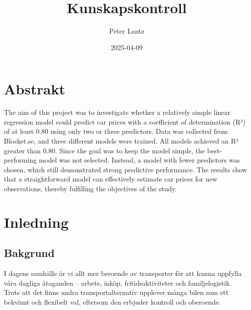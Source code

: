 \documentclass[
  letterpaper,
  DIV=11,
  numbers=noendperiod]{scrreprt}
\title{Kunskapskontroll}
\author{Peter Lantz}
\date{2025-04-09}
\renewcommand*\contentsname{Innehållsförteckning}
\newcommand\contentsname{Innehållsförteckning}
\begin{document}
\maketitle

\renewcommand*\contentsname{Innehållsförteckning}
{
\hypersetup{linkcolor=}
\setcounter{tocdepth}{2}
\tableofcontents
}


\chapter{}\label{section}


\chapter{Abstrakt}\label{abstrakt}

The aim of this project was to investigate whether a relatively simple
linear regression model could predict car prices with a coefficient of
determination (R²) of at least 0.80 using only two or three predictors.
Data was collected from Blocket.se, and three different models were
trained. All models achieved an R² greater than 0.80. Since the goal was
to keep the model simple, the best-performing model was not selected.
Instead, a model with fewer predictors was chosen, which still
demonstrated strong predictive performance. The results show that a
straightforward model can effectively estimate car prices for new
observations, thereby fulfilling the objectives of the study.


\chapter{Inledning}\label{inledning}


\section{Bakgrund}\label{bakgrund}

I dagens samhälle är vi allt mer beroende av transporter för att kunna
uppfylla våra dagliga åtaganden -- arbete, inköp, fritidsaktiviteter och
familjelogistik. Trots att det finns andra transportalternativ upplever
många bilen som ett bekvämt och flexibelt val, eftersom den erbjuder
kontroll och oberoende.
\end{document}
